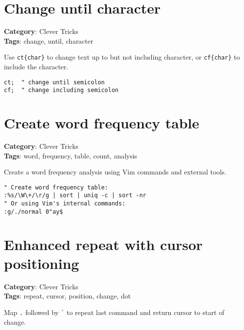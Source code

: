 {{{\section{Change until character}

\textbf{Category}: Clever Tricks\\ \textbf{Tags}: change, until, character
\vspace{0.5cm}

Use {\footnotesize \Verb§ct{char}§} to change text up to but not including character, or {\footnotesize \Verb§cf{char}§} to include the character.

\begin{Exa*}{}
\begin{Verbatim}[fontsize=\footnotesize, breaklines, breakanywhere]
ct;  " change until semicolon
cf;  " change including semicolon
\end{Verbatim}
\end{Exa*}

\section{Create word frequency table}

\textbf{Category}: Clever Tricks\\ \textbf{Tags}: word, frequency, table, count, analysis
\vspace{0.5cm}

Create a word frequency analysis using Vim commands and external tools.

\begin{Exa*}{}
\begin{Verbatim}[fontsize=\footnotesize, breaklines, breakanywhere]
" Create word frequency table:
:%s/\W\+/\r/g | sort | uniq -c | sort -nr
" Or using Vim's internal commands:
:g/./normal 0"ay$
\end{Verbatim}
\end{Exa*}

\section{Enhanced repeat with cursor positioning}

\textbf{Category}: Clever Tricks\\ \textbf{Tags}: repeat, cursor, position, change, dot
\vspace{0.5cm}

Map {\footnotesize \Verb§.§} followed by {\footnotesize \Verb§`§} to repeat last command and return cursor to start of change.

}}}
